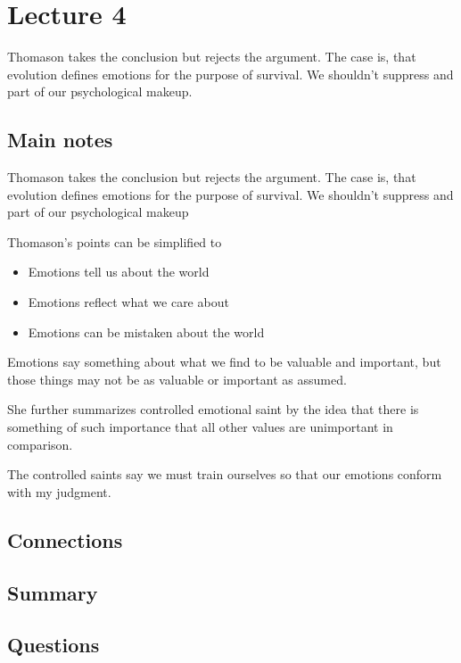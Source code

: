 \section{Lecture 4}
Thomason takes the conclusion but rejects the argument. The case is, that evolution defines emotions for the purpose of survival. We shouldn't suppress and part of our psychological makeup.


\subsection{Main notes}
Thomason takes the conclusion but rejects the argument. The case is, that evolution defines emotions for the purpose of survival. We shouldn't suppress and part of our psychological makeup

Thomason's points can be simplified to
\begin{itemize}
	\item Emotions tell us about the world
  \item Emotions reflect what we care about
  \item Emotions can be mistaken about the world
\end{itemize}

Emotions say something about what we find to be valuable and important, but those things may not be as valuable or important as assumed.

She further summarizes controlled emotional saint by the idea that there is something of such importance that all other values are unimportant in comparison.

The controlled saints say we must train ourselves so that our emotions conform with my judgment.
\subsection{Connections}


\subsection{Summary}


\subsection{Questions}
